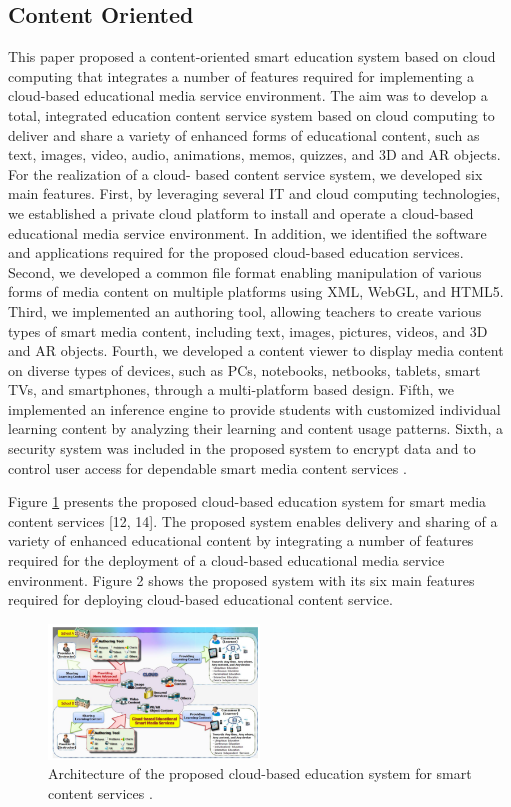 \documentclass[journal]{vgtc}                %
\begin{document}
  \subsection{Content Oriented}
  This paper proposed a content-oriented smart education system based on cloud computing that integrates a number of features required for implementing a cloud-based educational media service environment. The aim was to develop a total, integrated education content service system based on cloud computing to deliver and share a variety of enhanced forms of educational content, such as text, images, video, audio, animations, memos, quizzes, and 3D and AR objects. For the realization of a cloud- based content service system, we developed six main features. First, by leveraging several IT and cloud computing technologies, we established a private cloud platform to install and operate a cloud-based educational media service environment. In addition, we identified the software and applications required for the proposed cloud-based education services. Second, we developed a common file format enabling manipulation of various forms of media content on multiple platforms using XML, WebGL, and HTML5. Third, we implemented an authoring tool, allowing teachers to create various types of smart media content, including text, images, pictures, videos, and 3D and AR objects. Fourth, we developed a content viewer to display media content on diverse types of devices, such as PCs, notebooks, netbooks, tablets, smart TVs, and smartphones, through a multi-platform based design. Fifth, we implemented an inference engine to provide students with customized individual learning content by analyzing their learning and content usage patterns. Sixth, a security system was included in the proposed system to encrypt data and to control user access for dependable smart media content services \cite{jeong2013content} \cite{jeong2013cloud}.

  Figure \ref{archi} presents the proposed cloud-based education system for smart media content services [12, 14]. The proposed system enables delivery and sharing of a variety of enhanced educational content by integrating a number of features required for the deployment of a cloud-based educational media service environment. Figure 2 shows the proposed system with its six main features required for deploying cloud-based educational content service.

  \begin{figure}[htb]
    \centering
    \includegraphics[width=0.5\textwidth]{content-oriented-archi}
    \caption{Architecture of the proposed cloud-based education system for smart content services \cite{jeong2013content}.}
    \label{archi}
  \end{figure}
  
\end{document}
